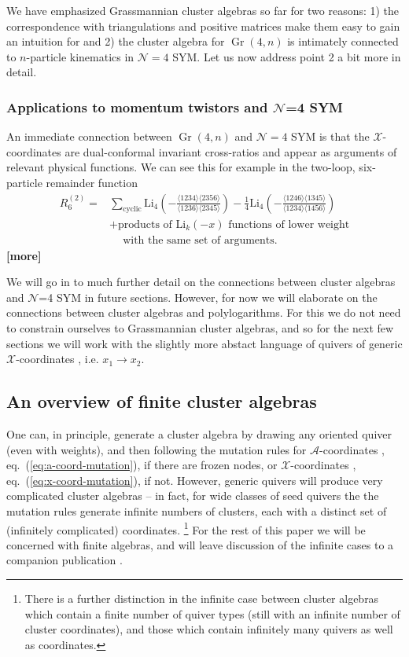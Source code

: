 \documentclass[11pt]{article}
\DeclareMathOperator{\Gr}{Gr}
\def\nl{\nonumber\\}
\def\nn{\nonumber}
\def\x{\mathcal{X}}
\def\xcoords{$\mathcal{X}$-coordinates }
\def\acoords{$\mathcal{A}$-coordinates }
\def\draftnote#1{{\bf [#1]}}
\def\pdfeq#1{\texorpdfstring{$#1$}{a}}
\begin{document}
We have emphasized Grassmannian cluster algebras so far for two reasons: 1) the correspondence with triangulations and positive matrices make them easy to gain an intuition for and 2) the cluster algebra for $\Gr(4,n)$ is intimately connected to $n$-particle kinematics in $\mathcal{N}=4$ SYM. Let us now address point 2 a bit more in detail.


\subsubsection{Applications to momentum twistors and \pdfeq{\mathcal{N}}=4 SYM}

An immediate connection between $\Gr(4,n)$ and $\mathcal{N}=4$ SYM is that the $\x$-coordinates are dual-conformal invariant cross-ratios and appear as arguments of relevant physical functions. We can see this for example in the two-loop, six-particle remainder function 
\begin{align}
	R^{(2)}_6 = &\sum_{\text{cyclic}} \text{Li}_4\left(-\frac{\langle 1234 \rangle \langle 2356 \rangle}{\langle 1236 \rangle \langle 2345 \rangle}\right) - \frac{1}{4} \text{Li}_4 \left(-\frac{\langle 1246 \rangle \langle 1345 \rangle}{\langle 1234 \rangle \langle 1456 \rangle}\right)\nl
	&+\text{products of } \text{Li}_{k}(-x) \text{ functions of lower weight}\\ &\quad~\text{with the same set of arguments.}\nn
\end{align}
\draftnote{more}

We will go in to much further detail on the connections between cluster algebras and $\mathcal{N}$=4 SYM in future sections. However, for now we will elaborate on the connections between cluster algebras and polylogarithms. For this we do not need to constrain ourselves to Grassmannian cluster algebras, and so for the next few sections we will work with the slightly more abstact language of quivers of generic \xcoords, i.e. $x_1 \to x_2$. 

\subsection{An overview of finite cluster algebras}\label{sec:finite-algebras}

One can, in principle, generate a cluster algebra by drawing any oriented quiver (even with weights), and then following the mutation rules for \acoords, eq.~(\ref{eq:a-coord-mutation}), if there are frozen nodes, or \xcoords, eq.~(\ref{eq:x-coord-mutation}), if not. However, generic quivers will produce very complicated cluster algebras -- in fact, for wide classes of seed quivers the the mutation rules generate infinite numbers of clusters, each with a distinct set of (infinitely complicated) coordinates. \footnote{There is a further distinction in the infinite case between cluster algebras which contain a finite number of quiver types (still with an infinite number of cluster coordinates), and those which contain infinitely many quivers as well as coordinates.} For the rest of this paper we will be concerned with finite algebras, and will leave discussion of the infinite cases to a companion publication \cite{}. 
\end{document}

